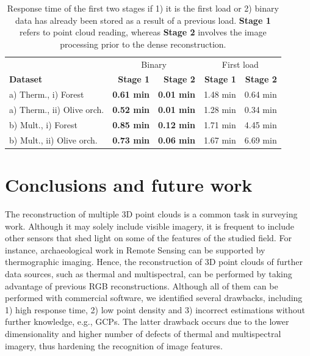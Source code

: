\renewcommand{\arraystretch}{1.2}
\begin{table}
    \centering
    \caption{Response time of the first two stages if 1) it is the first load or 2) binary data has already been stored as a result of a previous load. \textbf{Stage 1} refers to point cloud reading, whereas \textbf{Stage 2} involves the image processing prior to the dense reconstruction.  }
    \label{table:binary_results}
    \begin{tabular}{l|rr|rr}
    \toprule
    & \multicolumn{2}{c}{Binary} & \multicolumn{2}{c}{First load}\\
    \cmidrule{1-5}
    \textbf{Dataset} & \textbf{Stage 1} & \textbf{Stage 2} & \textbf{Stage 1} & \textbf{Stage 2}\\
    \cmidrule{1-5}
    a) Therm., i) Forest & \textbf{0.61 \si{\minute}} & \textbf{0.01 \si{\minute}} & 1.48 \si{\minute} & 0.64 \si{\minute}\\
    \cmidrule{1-5}
    a) Therm., ii) Olive orch. & \textbf{0.52 \si{\minute}} & \textbf{0.01 \si{\minute}} & 1.28 \si{\minute} & 0.34 \si{\minute}\\
    \cmidrule{1-5}
    b) Mult., i) Forest & \textbf{0.85 \si{\minute}} & \textbf{0.12 \si{\minute}} & 1.71 \si{\minute} & 4.45 \si{\minute}\\
    \cmidrule{1-5}
    b) Mult., ii) Olive orch. & \textbf{0.73 \si{\minute}} & \textbf{0.06 \si{\minute}} & 1.67 \si{\minute} & 6.69 \si{\minute}\\
    \bottomrule
    \end{tabular}
\end{table}
\renewcommand{\arraystretch}{1}

\section{Conclusions and future work}

The reconstruction of multiple 3D point clouds is a common task in surveying work. Although it may solely include visible imagery, it is frequent to include other sensors that shed light on some of the features of the studied field. For instance, archaeological work in Remote Sensing can be supported by thermographic imaging. Hence, the reconstruction of 3D point clouds of further data sources, such as thermal and multispectral, can be performed by taking advantage of previous RGB reconstructions. Although all of them can be performed with commercial software, we identified several drawbacks, including 1) high response time, 2) low point density and 3) incorrect estimations without further knowledge, e.g., GCPs. The latter drawback occurs due to the lower dimensionality and higher number of defects of thermal and multispectral imagery, thus hardening the recognition of image features.

